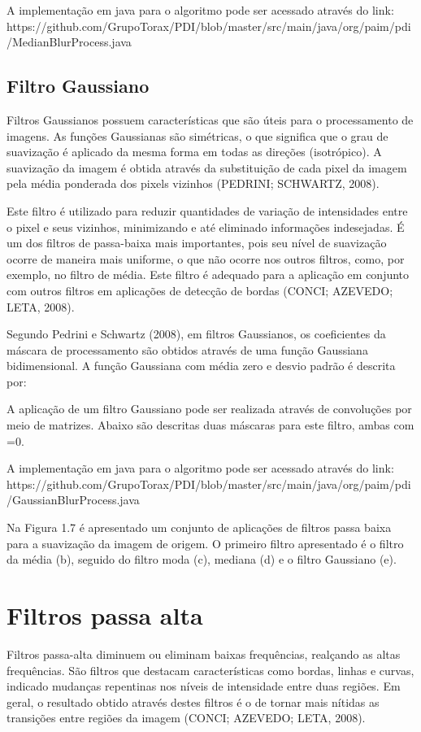 \documentclass[
	12pt,				%
	oneside,			%
	a4paper,			%
	english,			%
	french,				%
	spanish,			%
	brazil,				%
	]{abntex2}
\begin{document}
A implementação em java para o algoritmo pode ser acessado através do link:
https://github.com/GrupoTorax/PDI/blob/master/src/main/java/org/paim/pdi/MedianBlurProcess.java 

\subsection{Filtro Gaussiano}
Filtros Gaussianos possuem características que são úteis para o processamento de imagens. As funções Gaussianas são simétricas, o que significa que o grau de suavização é aplicado da mesma forma em todas as direções (isotrópico). A suavização da imagem é obtida através da substituição de cada pixel da imagem pela média ponderada dos pixels vizinhos (PEDRINI; SCHWARTZ, 2008). 

Este filtro é utilizado para reduzir quantidades de variação de intensidades entre o pixel e seus vizinhos, minimizando e até eliminado informações indesejadas. É um dos filtros de passa-baixa mais importantes, pois seu nível de suavização ocorre de maneira mais uniforme, o que não ocorre nos outros filtros, como, por exemplo, no filtro de média. Este filtro é adequado para a aplicação em conjunto com outros filtros em aplicações de detecção de bordas (CONCI; AZEVEDO; LETA, 2008).   

Segundo Pedrini e Schwartz (2008), em filtros Gaussianos, os coeficientes da máscara de processamento são obtidos através de uma função Gaussiana bidimensional. A função Gaussiana com média zero e desvio padrão é descrita por:

A aplicação de um filtro Gaussiano pode ser realizada através de convoluções por meio de matrizes. Abaixo são descritas duas máscaras para este filtro, ambas com =0.

 A implementação em java para o algoritmo pode ser acessado através do link:
https://github.com/GrupoTorax/PDI/blob/master/src/main/java/org/paim/pdi/GaussianBlurProcess.java 

Na Figura 1.7 é apresentado um conjunto de aplicações de filtros passa baixa para a suavização da imagem de origem. O primeiro filtro apresentado é o filtro da média (b), seguido do filtro moda (c), mediana (d) e o filtro Gaussiano (e).

\section{Filtros passa alta}

Filtros passa-alta diminuem ou eliminam baixas frequências, realçando as altas frequências. São filtros que destacam características como bordas, linhas e curvas, indicado mudanças repentinas nos níveis de intensidade entre duas regiões. Em geral, o resultado obtido através destes filtros é o de tornar mais nítidas as transições entre regiões da imagem (CONCI; AZEVEDO; LETA, 2008).
\end{document}
